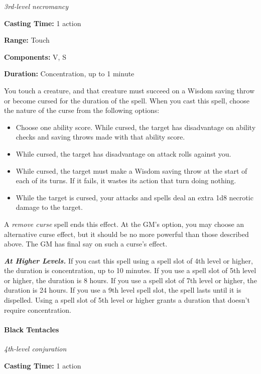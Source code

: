 \documentclass[
]{article}
\begin{document}
\emph{3rd-level necromancy}

\textbf{Casting Time:} 1 action

\textbf{Range:} Touch

\textbf{Components:} V, S

\textbf{Duration:} Concentration, up to 1 minute

You touch a creature, and that creature must succeed on a Wisdom saving
throw or become cursed for the duration of the spell. When you cast this
spell, choose the nature of the curse from the following options:

\begin{itemize}
\item
  Choose one ability score. While cursed, the target has disadvantage on
  ability checks and saving throws made with that ability score.
\item
  While cursed, the target has disadvantage on attack rolls against you.
\item
  While cursed, the target must make a Wisdom saving throw at the start
  of each of its turns. If it fails, it wastes its action that turn
  doing nothing.
\item
  While the target is cursed, your attacks and spells deal an extra 1d8
  necrotic damage to the target.
\end{itemize}

A \emph{remove curse} spell ends this effect. At the GM's option, you
may choose an alternative curse effect, but it should be no more
powerful than those described above. The GM has final say on such a
curse's effect.

\emph{\textbf{At Higher Levels.}} If you cast this spell using a spell
slot of 4th level or higher, the duration is concentration, up to 10
minutes. If you use a spell slot of 5th level or higher, the duration is
8 hours. If you use a spell slot of 7th level or higher, the duration is
24 hours. If you use a 9th level spell slot, the spell lasts until it is
dispelled. Using a spell slot of 5th level or higher grants a duration
that doesn't require concentration.

\hypertarget{black-tentacles}{%
\paragraph{Black Tentacles}\label{black-tentacles}}

\emph{4th-level conjuration}

\textbf{Casting Time:} 1 action
\end{document}
